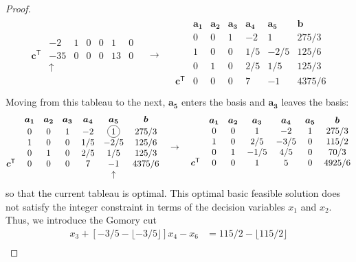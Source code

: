 \documentclass[12pt]{article}
\newcommand*\circled[1]{\tikz[baseline=(char.base)]{
            \node[shape=circle,draw,inner sep=2pt] (char) {#1};}}
\theoremstyle{definition}
\newcommand{\vc}[1]{\boldsymbol{#1}}
\newcommand{\tran}{\mathsf{T}}
\begin{document}
\begin{proof}
\begin{align*}
\begin{matrix}
      & -2 & 1 & 0 & 0 & 1 & 0 \\
      \vc{c}^\tran & -35 & 0 & 0 & 0 & 13 & 0\\
      &\uparrow& &&&&
    \end{matrix}
    \quad
    \to
    \quad
    \begin{matrix}
      & \vc{a_1} & \vc{a_2} & \vc{a_3} & \vc{a_4} & \vc{a_5} & \vc{b} \\
      & 0 & 0 & 1 & -2 & 1 & 275/3 \\
      & 1 & 0 & 0 & 1/5 & -2/5 & 125/6 \\
      & 0 & 1 & 0 & 2/5 & 1/5 & 125/3 \\
      \vc{c}^\tran & 0 & 0 & 0 & 7 & -1 & 4375/6 \\
      && &&&&
    \end{matrix}
  \end{align*}
  Moving from this tableau to the next, $\vc{a_5}$ enters the basis and $\vc{a_3}$ leaves the basis:
  \begin{align*}
    \begin{matrix}
      & \vc{a_1} & \vc{a_2} & \vc{a_3} & \vc{a_4} & \vc{a_5} & \vc{b} \\
      & 0 & 0 & 1 & -2 & \circled{1} & 275/3 \\
      & 1 & 0 & 0 & 1/5 & -2/5 & 125/6 \\
      & 0 & 1 & 0 & 2/5 & 1/5 & 125/3 \\
      \vc{c}^\tran & 0 & 0 & 0 & 7 & -1 & 4375/6 \\
      && &&&\uparrow &
    \end{matrix}
    \quad
    \to
    \quad
    \begin{matrix}
      & \vc{a_1} & \vc{a_2} & \vc{a_3} & \vc{a_4} & \vc{a_5} & \vc{b} \\
      & 0 & 0 & 1 & -2 & 1 & 275/3 \\
      & 1 & 0 & 2/5 & -3/5 & 0 & 115/2 \\
      & 0 & 1 & -1/5 & 4/5 & 0 & 70/3 \\
      \vc{c}^\tran & 0 & 0 & 1 & 5 & 0 & 4925/6 \\
      && &&&&
    \end{matrix}
  \end{align*}
  so that the current tableau is optimal. This optimal basic feasible solution
  does not satisfy the integer constraint in terms of the decision variables $x_1$ and $x_2$. Thus, we introduce the Gomory cut
  \begin{align*}
    [2/5 - \lfloor 2/5\rfloor]x_3 + [-3/5 - \lfloor -3/5 \rfloor] x_4  - x_6 &= 115/2 - \lfloor 115/2\rfloor \\

\end{align*}
\end{proof}
\end{document}
